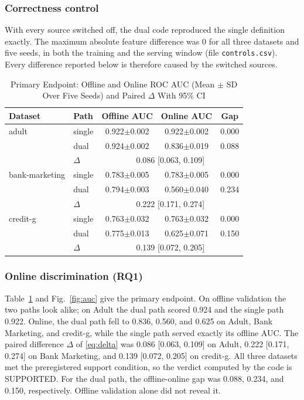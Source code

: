 \documentclass[journal]{IEEEtran}
\begin{document}
\subsubsection{Correctness control}
With every source switched off, the dual code reproduced the single definition exactly. The maximum absolute feature difference was 0 for all three datasets and five seeds, in both the training and the serving window (file \texttt{controls.csv}). Every difference reported below is therefore caused by the switched sources.

\begin{table}[!t]
\caption{Primary Endpoint: Offline and Online ROC AUC (Mean $\pm$ SD Over Five Seeds) and Paired $\Delta$ With 95\% CI}
\label{tab:main}
\centering
\footnotesize
\setlength{\tabcolsep}{3pt}
\begin{tabular}{@{}llccc@{}}
\toprule
Dataset & Path & Offline AUC & Online AUC & Gap \\
\midrule
adult & single & 0.922$\pm$0.002 & 0.922$\pm$0.002 & 0.000 \\
 & dual & 0.924$\pm$0.002 & 0.836$\pm$0.019 & 0.088 \\
 & $\Delta$ & \multicolumn{3}{c}{0.086 [0.063, 0.109]} \\
\midrule
bank-marketing & single & 0.783$\pm$0.005 & 0.783$\pm$0.005 & 0.000 \\
 & dual & 0.794$\pm$0.003 & 0.560$\pm$0.040 & 0.234 \\
 & $\Delta$ & \multicolumn{3}{c}{0.222 [0.171, 0.274]} \\
\midrule
credit-g & single & 0.763$\pm$0.032 & 0.763$\pm$0.032 & 0.000 \\
 & dual & 0.775$\pm$0.013 & 0.625$\pm$0.071 & 0.150 \\
 & $\Delta$ & \multicolumn{3}{c}{0.139 [0.072, 0.205]} \\
\bottomrule
\end{tabular}
\end{table}

\subsubsection{Online discrimination (RQ1)}
Table~\ref{tab:main} and Fig.~\ref{fig:auc} give the primary endpoint. On offline validation the two paths look alike; on Adult the dual path scored 0.924 and the single path 0.922. Online, the dual path fell to 0.836, 0.560, and 0.625 on Adult, Bank Marketing, and credit-g, while the single path served exactly its offline AUC. The paired difference $\Delta$ of \eqref{eq:delta} was 0.086 [0.063, 0.109] on Adult, 0.222 [0.171, 0.274] on Bank Marketing, and 0.139 [0.072, 0.205] on credit-g. All three datasets met the preregistered support condition, so the verdict computed by the code is SUPPORTED. For the dual path, the offline-online gap was 0.088, 0.234, and 0.150, respectively. Offline validation alone did not reveal it.
\end{document}
